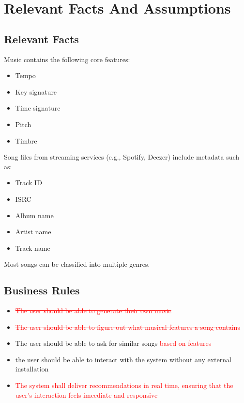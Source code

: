 \documentclass[12pt]{article}
\begin{document}
  

\section{Relevant Facts And Assumptions}
\subsection{Relevant Facts}

Music contains the following core features:
\begin{itemize}
    \item Tempo
    \item Key signature
    \item Time signature
    \item Pitch
    \item Timbre
\end{itemize}
\noindent Song files from streaming services (e.g., Spotify, Deezer) include metadata such as:
\begin{itemize}
    \item Track ID
    \item ISRC
    \item Album name
    \item Artist name
    \item Track name
\end{itemize}
\noindent Most songs can be classified into multiple genres.

\subsection{Business Rules}
\begin{itemize}
  \item \textcolor{red}{\sout{The user should be able to generate their own music}}
  \item \textcolor{red}{\sout{The user should be able to figure out what musical features a song contains }}
  \item The user should be able to ask for similar songs \textcolor{red}{based on features}
  \item the user should be able to interact with the system without any external installation
  \item \textcolor{red}{The system shall deliver recommendations in real time, ensuring that the user's interaction feels imeediate and responsive}
\end{itemize}
\end{document}
